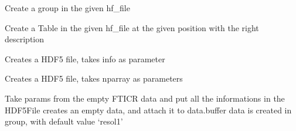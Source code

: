 \documentclass[letterpaper,10pt,openany,oneside]{sphinxmanual}
\begin{document}
\begin{fulllineitems}
\begin{fulllineitems}
\end{fulllineitems}


\begin{fulllineitems}
\label{rst/code:File.HDF5File.HDF5File.createGroup}
Create a group in the given hf\_file

\end{fulllineitems}


\begin{fulllineitems}
\label{rst/code:File.HDF5File.HDF5File.createTable}
Create a Table in the given hf\_file at the given position with the right description

\end{fulllineitems}


\begin{fulllineitems}
\label{rst/code:File.HDF5File.HDF5File.create_HDF5_info}
Creates a HDF5 file, takes info as parameter

\end{fulllineitems}


\begin{fulllineitems}
\label{rst/code:File.HDF5File.HDF5File.create_HDF5_nparray}
Creates a HDF5 file, takes nparray as parameters

\end{fulllineitems}


\begin{fulllineitems}
\label{rst/code:File.HDF5File.HDF5File.create_from_template}
Take params from the empty FTICR data and put all the informations in the HDF5File
creates an empty data, and attach it to data.buffer
data is created in group, with default value `resol1'


\end{fulllineitems}
\end{fulllineitems}
\end{document}
